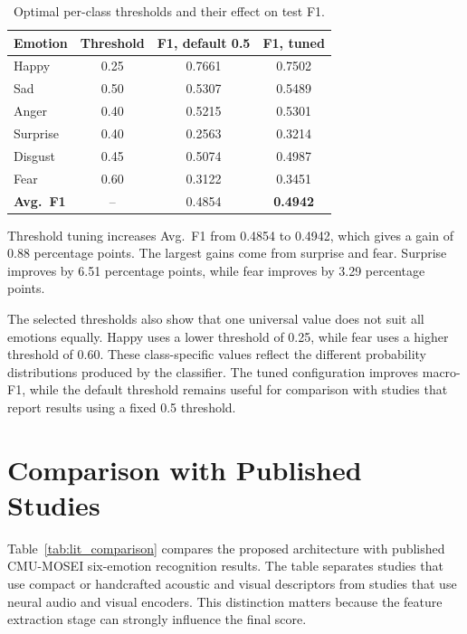 \begin{table}[H]
\centering
\caption{Optimal per-class thresholds and their effect on test F1.}
\label{tab:thresholds}
\begin{tabular}{lccc}
\hline
\textbf{Emotion} & \textbf{Threshold} & \textbf{F1, default 0.5} & \textbf{F1, tuned} \\
\hline
Happy    & 0.25 & 0.7661 & 0.7502 \\
Sad      & 0.50 & 0.5307 & 0.5489 \\
Anger    & 0.40 & 0.5215 & 0.5301 \\
Surprise & 0.40 & 0.2563 & 0.3214 \\
Disgust  & 0.45 & 0.5074 & 0.4987 \\
Fear     & 0.60 & 0.3122 & 0.3451 \\
\hline
\textbf{Avg.~F1} & -- & 0.4854 & \textbf{0.4942} \\
\hline
\end{tabular}
\end{table}

Threshold tuning increases Avg.~F1 from 0.4854 to 0.4942, which gives a gain of 0.88 percentage points. The largest gains come from surprise and fear. Surprise improves by 6.51 percentage points, while fear improves by 3.29 percentage points.

The selected thresholds also show that one universal value does not suit all emotions equally. Happy uses a lower threshold of 0.25, while fear uses a higher threshold of 0.60. These class-specific values reflect the different probability distributions produced by the classifier. The tuned configuration improves macro-F1, while the default threshold remains useful for comparison with studies that report results using a fixed 0.5 threshold.

\section{Comparison with Published Studies}
\label{sec:lit_comparison}

Table~\ref{tab:lit_comparison} compares the proposed architecture with published CMU-MOSEI six-emotion recognition results. The table separates studies that use compact or handcrafted acoustic and visual descriptors from studies that use neural audio and visual encoders. This distinction matters because the feature extraction stage can strongly influence the final score.

